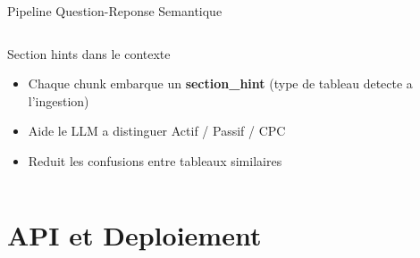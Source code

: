 \documentclass[aspectratio=169, 10pt]{beamer}
\begin{document}
\begin{frame}{Pipeline Question-Reponse Semantique}
\begin{columns}[T]
      \begin{block}{Section hints dans le contexte}
        \begin{itemize}\small
          \item Chaque chunk embarque un \textbf{section\_hint}
                (type de tableau detecte a l'ingestion)
          \item Aide le LLM a distinguer Actif / Passif / CPC
          \item Reduit les confusions entre tableaux similaires
        \end{itemize}
      \end{block}
  \end{columns}
\end{frame}

\section{API et Deploiement}
\end{document}

